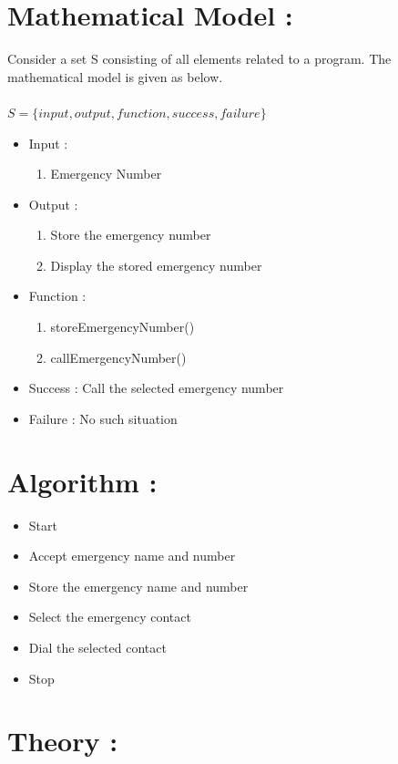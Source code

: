\documentclass{article}
\begin{document}
\section{Mathematical Model : }  
	Consider a set S consisting of all elements related to a program. 
	The mathematical model is given as below.  \\  \\
    $S=\{input,output,function,success,failure\}$
	\begin{itemize}
		\item Input  :
			\begin{enumerate}
				\item Emergency Number
			\end{enumerate}
		\item Output :
        	\begin{enumerate}
				\item Store the emergency number
                \item Display the stored emergency number
			\end{enumerate}
		\item Function :
			\begin{enumerate}
				\item storeEmergencyNumber()
   				\item callEmergencyNumber()
			\end{enumerate}
		\item Success : Call the selected emergency number
        \item Failure : No such situation
	\end{itemize}  

\section{Algorithm : }
	\begin{itemize}
		\item Start
        \item Accept emergency name and number
        \item Store the emergency name and number
        \item Select the emergency contact
        \item Dial the selected contact
        \item Stop
	\end{itemize}


\section{Theory : }
 	
\end{document}
